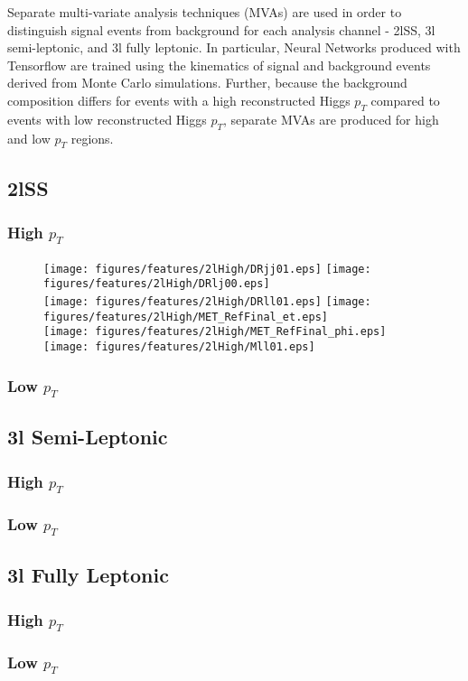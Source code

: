 Separate multi-variate analysis techniques (MVAs) are used in order to distinguish signal events from background for each analysis channel - 2lSS, 3l semi-leptonic, and 3l fully leptonic. In particular, Neural Networks produced with Tensorflow are trained using the kinematics of signal and background events derived from Monte Carlo simulations. Further, because the background composition differs for events with a high reconstructed Higgs $p_T$ compared to events with low reconstructed Higgs $p_T$, separate MVAs are produced for high and low $p_T$ regions. 

\subsection{2lSS}
\label{sec:2lSigBkg}

\subsubsection{High $p_T$}
\label{sec:2lHigh}

\begin{figure}[!htbp]
\centering
\texttt{[image: figures/features/2lHigh/DRjj01.eps]}%
\texttt{[image: figures/features/2lHigh/DRlj00.eps]}\\
\texttt{[image: figures/features/2lHigh/DRll01.eps]}%
\texttt{[image: figures/features/2lHigh/MET\_RefFinal\_et.eps]}\\
\texttt{[image: figures/features/2lHigh/MET\_RefFinal\_phi.eps]}%
\texttt{[image: figures/features/2lHigh/Mll01.eps]}\\
\caption{}
\label{fig:}
\end{figure}

\subsubsection{Low $p_T$}
\label{sec:2lLow}

\subsection{3l Semi-Leptonic}
\label{sec:3lSSigBkg}

\subsubsection{High $p_T$}
\label{sec:3lSHigh}

\subsubsection{Low $p_T$}
\label{sec:3lSLow}

\subsection{3l Fully Leptonic}
\label{sec:3lFSigBkg}

\subsubsection{High $p_T$}
\label{sec:3lFHigh}

\subsubsection{Low $p_T$}
\label{sec:3lFLow}
